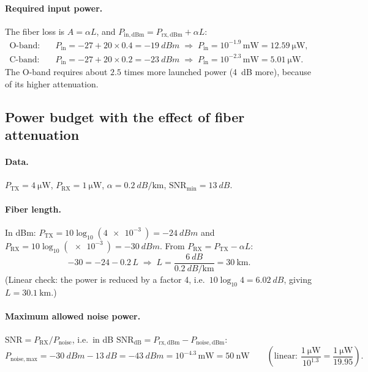 \paragraph{Required input power.}
The fiber loss is $A = \alpha L$, and $P_\mathrm{in,dBm} = P_\mathrm{rx,dBm} + \alpha L$:
\begin{align}
  \text{O-band:}\quad & P_\mathrm{in} = -27 + 20\times0.4 = \SI{-19}{dBm}
  \;\Rightarrow\; P_\mathrm{in} = 10^{-1.9}\,\si{\milli\watt} = \SI{12.59}{\micro\watt},\\
  \text{C-band:}\quad & P_\mathrm{in} = -27 + 20\times0.2 = \SI{-23}{dBm}
  \;\Rightarrow\; P_\mathrm{in} = 10^{-2.3}\,\si{\milli\watt} = \SI{5.01}{\micro\watt}.
\end{align}
The O-band requires about $2.5$ times more launched power (\SI{4}{dB} more), because of its higher attenuation.


\subsection{Power budget with the effect of fiber attenuation}
\label{sec:2_6}
\paragraph{Data.} $P_\mathrm{TX} = \SI{4}{\micro\watt}$, $P_\mathrm{RX} = \SI{1}{\micro\watt}$,
$\alpha = \SI{0.2}{dB\per\kilo\metre}$, $\mathrm{SNR}_\mathrm{min} = \SI{13}{dB}$.

\paragraph{Fiber length.}
In dBm: $P_\mathrm{TX} = 10\log_{10}(\SI{4e-3}{}) = \SI{-24}{dBm}$ and
$P_\mathrm{RX} = 10\log_{10}(\SI{e-3}{}) = \SI{-30}{dBm}$. From $P_\mathrm{RX} = P_\mathrm{TX} - \alpha L$:
\begin{equation}
  -30 = -24 - 0.2\,L
  \;\Rightarrow\; L = \frac{\SI{6}{dB}}{\SI{0.2}{dB\per\kilo\metre}} = \SI{30}{\kilo\metre}.
\end{equation}
(Linear check: the power is reduced by a factor 4, i.e.\ $10\log_{10}4 = \SI{6.02}{dB}$, giving $L = \SI{30.1}{\kilo\metre}$.)

\paragraph{Maximum allowed noise power.}
$\mathrm{SNR} = P_\mathrm{RX}/P_\mathrm{noise}$, i.e.\ in dB
$\mathrm{SNR}_\mathrm{dB} = P_\mathrm{rx,dBm} - P_\mathrm{noise,dBm}$:
\begin{equation}
  P_\mathrm{noise,max} = \SI{-30}{dBm} - \SI{13}{dB} = \SI{-43}{dBm}
  = 10^{-4.3}\,\si{\milli\watt} = \SI{50}{\nano\watt}
  \qquad\left(\text{linear: } \frac{\SI{1}{\micro\watt}}{10^{1.3}} = \frac{\SI{1}{\micro\watt}}{19.95}\right).
\end{equation}
